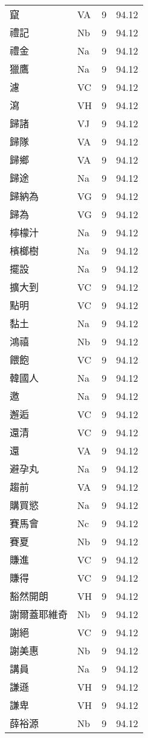 \documentclass[twocolumn]{book}
\begin{document}
\begin{supertabular}{llrr}
竄 & VA & 9 &  94.12\\
禮記 & Nb & 9 &  94.12\\
禮金 & Na & 9 &  94.12\\
獵鷹 & Na & 9 &  94.12\\
濾 & VC & 9 &  94.12\\
瀉 & VH & 9 &  94.12\\
歸諸 & VJ & 9 &  94.12\\
歸隊 & VA & 9 &  94.12\\
歸鄉 & VA & 9 &  94.12\\
歸途 & Na & 9 &  94.12\\
歸納為 & VG & 9 &  94.12\\
歸為 & VG & 9 &  94.12\\
檸檬汁 & Na & 9 &  94.12\\
檳榔樹 & Na & 9 &  94.12\\
擺設 & Na & 9 &  94.12\\
擴大到 & VC & 9 &  94.12\\
點明 & VC & 9 &  94.12\\
黏土 & Na & 9 &  94.12\\
鴻禧 & Nb & 9 &  94.12\\
餵飽 & VC & 9 &  94.12\\
韓國人 & Na & 9 &  94.12\\
邀 & Na & 9 &  94.12\\
邂逅 & VC & 9 &  94.12\\
還清 & VC & 9 &  94.12\\
還 & VA & 9 &  94.12\\
避孕丸 & Na & 9 &  94.12\\
趨前 & VA & 9 &  94.12\\
購買慾 & Na & 9 &  94.12\\
賽馬會 & Nc & 9 &  94.12\\
賽夏 & Nb & 9 &  94.12\\
賺進 & VC & 9 &  94.12\\
賺得 & VC & 9 &  94.12\\
豁然開朗 & VH & 9 &  94.12\\
謝爾蓋耶維奇 & Nb & 9 &  94.12\\
謝絕 & VC & 9 &  94.12\\
謝美惠 & Nb & 9 &  94.12\\
講員 & Na & 9 &  94.12\\
謙遜 & VH & 9 &  94.12\\
謙卑 & VH & 9 &  94.12\\
薛裕源 & Nb & 9 &  94.12\\

\end{supertabular}
\end{document}
